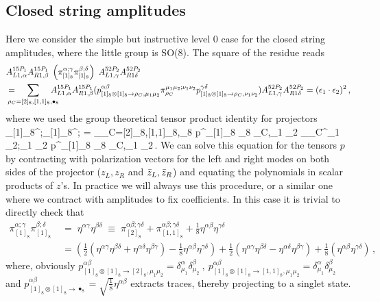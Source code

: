 \subsection{Closed string amplitudes}
Here we consider the simple but instructive level 0 case for the closed string amplitudes, where the little group is SO(8). The square of the residue reads
\begin{align}
\label{eq:level0_closed_so8}
		{}&A^{15P_1}_{L1, \alpha}A^{15P_1}_{R1,\beta} \; \left( \pi_{[1]_8}^{\alpha ;\gamma}\pi_{[1]_8}^{\beta ;\delta} \right) \;  A^{52P_2}_{L1,\gamma}A^{52P_2}_{R1\delta}     \\
&= \hspace{-.4cm} \sum_{\rho_C=[2]_8,[1,1]_8,\bullet_8} \hspace{-.4cm}   A^{15P_1}_{L1, \alpha}A^{15P_1}_{R1,\beta}(
		p^{\alpha \beta}_{[1]_8 \otimes [1]_8 \to \rho_C,\mu_1 \mu_2}
		\pi_{\rho_C}^{\mu_1 \mu_2;\nu_1 \nu_2}
		p^{\gamma \delta}_{[1]_8 \otimes [1]_8 \to \rho_C,\nu_1 \nu_2})A^{52P_2}_{L1,\gamma}A^{52P_2}_{R1\delta}
		= (\epsilon_1\cdot \epsilon_2)^2  \,,
\nonumber
\end{align}
where we used the group theoretical tensor product identity for projectors
	\beq
	 	\pi_{[1]_8}^{\alpha ;\gamma}\pi_{[1]_8}^{\beta ;\delta} \; = \sum_{\rho_C=[2]_8,[1,1]_8,\bullet_8} p^{\alpha \beta}_{[1]_8 \otimes [1]_8 \to \rho_C,\mu_1 \mu_2}
	 	\pi_{\rho_C}^{\mu_1 \mu_2;\nu_1 \nu_2}
	 	p^{\gamma \delta}_{[1]_8 \otimes [1]_8 \to \rho_C,\nu_1 \nu_2}\,.
	\eeq
We can solve this equation for the tensors $p$ by contracting with polarization vectors for the left and right modes on both sides of the projector ($z_L,z_R$ and $\bar{z}_L,\bar{z}_R$) and equating the polynomials in scalar products of $z$'s. In practice we will always use this procedure, or a similar one where we contract with amplitudes to fix coefficients. In this case it is trivial to directly check that
	\begin{align}
		\pi_{[1]_8}^{\alpha ;\gamma}\pi_{[1]_8}^{\beta ;\delta} \; 
		&= \; \eta^{\alpha \gamma}\eta^{\beta \delta}	\;\equiv \;  \pi_{[2]_8}^{\alpha \beta;\gamma \delta} + \pi_{[1,1]_8}^{\alpha \beta;\gamma \delta} + \frac{1}{8} \eta^{\alpha \beta} \eta^{\gamma \delta}
	\label{eq:level0_closed_check}
	       \\
& = \left(\frac{1}{2}( \eta^{\alpha \gamma}\eta^{\beta \delta}+\eta^{\alpha \delta}\eta^{\beta \gamma})-\frac{1}{8} \eta^{\alpha \beta}\eta^{\gamma \delta}\right) 
		+ \frac{1}{2}(\eta^{\alpha \gamma}\eta^{\beta \delta}-\eta^{\alpha \delta}\eta^{\beta \gamma}) + \frac{1}{8}(\eta^{\alpha \beta}\eta^{\gamma \delta})\,,
	\nonumber
\end{align}
where, obviously $p^{\alpha \beta}_{[1]_8 \otimes [1]_8 \to [2]_8,\mu_1 \mu_2}=\delta^\alpha_{\mu_1}\delta^\beta_{\mu_2} ~,~p^{\alpha \beta}_{[1]_8 \otimes [1]_8 \to [1,1]_8,\mu_1 \mu_2}=\delta^\alpha_{\mu_1}\delta^\beta_{\mu_2}$ and $p^{\alpha \beta}_{[1]_8 \otimes [1]_8 \to \bullet_8}= \sqrt{\frac{1 }{8}}\eta^{\alpha\beta}$ extracts traces, thereby projecting to a singlet state.
 


